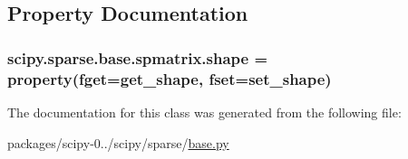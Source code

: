 \subsection{Property Documentation}
\hypertarget{classscipy_1_1sparse_1_1base_1_1spmatrix_ade686c26cbca7e0ef89fe3be9c88d240}{}
\subsubsection[{shape}]{\setlength{\rightskip}{0pt plus 5cm}scipy.\+sparse.\+base.\+spmatrix.\+shape = property(fget={\bf get\+\_\+shape}, fset={\bf set\+\_\+shape})\hspace{0.3cm}{\ttfamily [static]}}\label{classscipy_1_1sparse_1_1base_1_1spmatrix_ade686c26cbca7e0ef89fe3be9c88d240}


The documentation for this class was generated from the following file\+:\begin{DoxyCompactItemize}
\item 
packages/scipy-\/0../scipy/sparse/\hyperlink{base_8py}{base.\+py}\end{DoxyCompactItemize}
